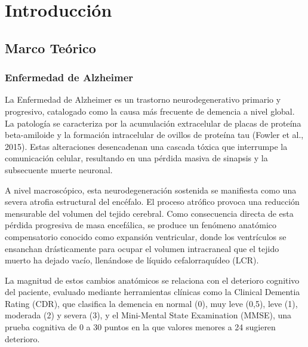 \documentclass[10pt]{article}
\begin{document}
\thispagestyle{fancy}

\newpage
\tableofcontents
\thispagestyle{fancy}

\newpage


\section{Introducción}

\subsection{Marco Teórico}
\subsubsection{Enfermedad de Alzheimer}

La Enfermedad de Alzheimer es un trastorno neurodegenerativo primario y progresivo, catalogado como la causa más frecuente de demencia a nivel global. La patología se caracteriza por la acumulación extracelular de placas de proteína beta-amiloide y la formación intracelular de ovillos de proteína tau (Fowler et al., 2015). Estas alteraciones desencadenan una cascada tóxica que interrumpe la comunicación celular, resultando en una pérdida masiva de sinapsis y la subsecuente muerte neuronal.

A nivel macroscópico, esta neurodegeneración sostenida se manifiesta como una severa atrofia estructural del encéfalo. El proceso atrófico provoca una reducción mensurable del volumen del tejido cerebral. Como consecuencia directa de esta pérdida progresiva de masa encefálica, se produce un fenómeno anatómico compensatorio conocido como expansión ventricular, donde los ventrículos se ensanchan drásticamente para ocupar el volumen intracraneal que el tejido muerto ha dejado vacío, llenándose de líquido cefalorraquídeo (LCR).

La magnitud de estos cambios anatómicos se relaciona con el deterioro cognitivo del paciente, evaluado mediante herramientas clínicas como la Clinical Dementia Rating (CDR), que clasifica la demencia en normal (0), muy leve (0,5), leve (1), moderada (2) y severa (3), y el Mini-Mental State Examination (MMSE), una prueba cognitiva de 0 a 30 puntos en la que valores menores a 24 sugieren deterioro.
\end{document}
